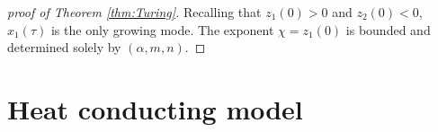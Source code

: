 \documentclass[a4paper,11pt]{article}
\newtheorem{theorem}{Theorem}
\theoremstyle{remark}
\begin{document}
{\begin{proof}[proof of Theorem \ref{thm:Turing}]
 Recalling that $z_1(0)>0$ and $z_2(0)<0$, $x_1(\tau)$ is the only growing mode. The exponent $\chi=z_1(0)$ is bounded and determined solely by $(\alpha,m,n)$.
%
\end{proof}

%
%

\section{Heat conducting model}

}
\end{document}
